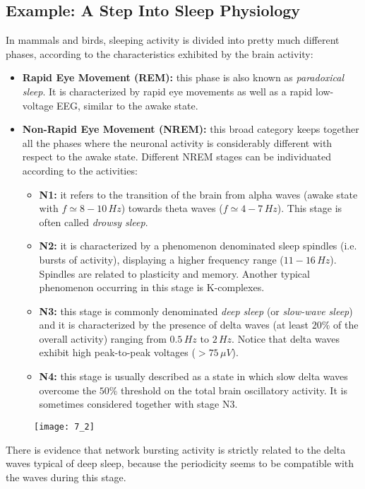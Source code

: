 \subsection{Example: A Step Into Sleep Physiology}
In mammals and birds, sleeping activity is divided into pretty much different
phases, according to the characteristics exhibited by the brain activity:
\begin{itemize}
    \item \textbf{Rapid Eye Movement (REM):} this phase is also known as \textit{paradoxical
          sleep}. It is characterized by rapid eye movements as well as a rapid low-voltage EEG, similar to the awake state. 
    \item \textbf{Non-Rapid Eye Movement (NREM):} this broad category keeps together
          all the phases where the neuronal activity is considerably different with respect to the awake state. Different NREM stages can be individuated according to the activities:
          \begin{itemize}
              \item \textbf{N1:} it refers to the transition of the brain from alpha waves
                    (awake state with \(f\simeq8-10\,Hz\)) towards theta waves (\(f\simeq4-7\,Hz\)). This stage is often called \textit{drowsy sleep}.
              \item \textbf{N2:} it is characterized by a phenomenon denominated sleep
                    spindles (i.e. bursts of activity), displaying a higher frequency range (\(11-16\,Hz\)). Spindles are related to plasticity and memory. Another typical phenomenon occurring in this stage is K-complexes. 
              \item \textbf{N3:} this stage is commonly denominated \textit{deep sleep} (or \textit{slow-wave sleep}) and it is
                    characterized by the presence of delta waves (at least \(20\%\) of the
                    overall activity) ranging from \(0.5\,Hz\) to \(2\,Hz\). Notice that delta waves exhibit high peak-to-peak voltages (\(>75\,\mu{V}\)).
              \item \textbf{N4:} this stage is usually described as a state in which slow
                    delta waves overcome the \(50\%\) threshold on the total brain oscillatory
                    activity. It is sometimes considered together with stage N3.
          \end{itemize}
\end{itemize}
\begin{figure}[H]
    \texttt{[image: 7\_2]}
    \centering
\end{figure}
There is evidence that network bursting activity is strictly related to the delta waves 
typical of deep sleep, because the periodicity seems to be compatible with the waves during this stage.

